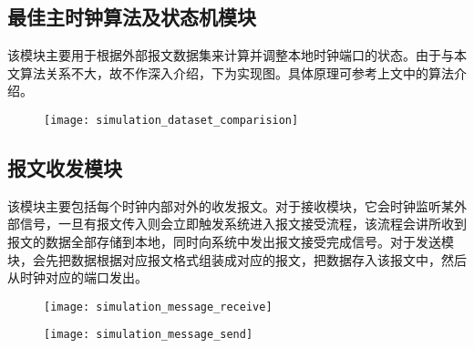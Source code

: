 \subsection{最佳主时钟算法及状态机模块}
该模块主要用于根据外部报文数据集来计算并调整本地时钟端口的状态。由于与本文算法关系不大，故不作深入介绍，下为实现图。具体原理可参考上文中的算法介绍。
\begin{figure}[!hbp]
  \centering
  \begin{minipage}[b]{1\textwidth}
    \captionstyle{\centering}
    \centering
    \texttt{[image: simulation\_dataset\_comparision]}
  \end{minipage}     
\end{figure}

\subsection{报文收发模块}
该模块主要包括每个时钟内部对外的收发报文。对于接收模块，它会时钟监听某外部信号，一旦有报文传入则会立即触发系统进入报文接受流程，该流程会讲所收到报文的数据全部存储到本地，同时向系统中发出报文接受完成信号。对于发送模块，会先把数据根据对应报文格式组装成对应的报文，把数据存入该报文中，然后从时钟对应的端口发出。
\begin{figure}[!hbp]
  \centering
  \begin{minipage}[b]{1\textwidth}
    \captionstyle{\centering}
    \centering
    \texttt{[image: simulation\_message\_receive]}
  \end{minipage}     
\end{figure}
\begin{figure}[!hbp]
  \centering
  \begin{minipage}[b]{1\textwidth}
    \captionstyle{\centering}
    \centering
    \texttt{[image: simulation\_message\_send]}
  \end{minipage}     
\end{figure}


